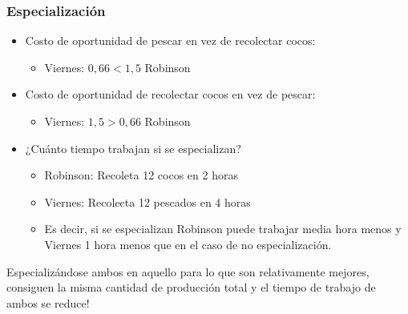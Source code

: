 \documentclass{beamer}
\begin{document}
\begin{frame}
\frametitle{Especialización}

\begin{itemize}
    \item Costo de oportunidad de pescar en vez de recolectar cocos:
        \begin{itemize}
        \item Viernes: $ 0,66 < 1,5 $ Robinson 
        \end{itemize}
    \item Costo de oportunidad de recolectar cocos en vez de pescar:
        \begin{itemize}
        \item Viernes: $ 1,5 > 0,66 $ Robinson 
        \end{itemize}
    \item ¿Cuánto tiempo trabajan si se especializan?
            \begin{itemize}
            \item Robinson: Recoleta 12 cocos en 2 horas
            \item Viernes: Recolecta 12 pescados en 4 horas
            \item Es decir, si se especializan Robinson puede trabajar media hora menos y Viernes 1 hora menos que en el caso de no especialización. 
            \end{itemize}
\end{itemize}
    \begin{boxB}
        \centering
        Especializándose ambos en aquello para lo que
        son relativamente mejores, consiguen la misma cantidad de producción total y el tiempo de trabajo de ambos se reduce!
    \end{boxB}
\end{frame}
\end{document}
